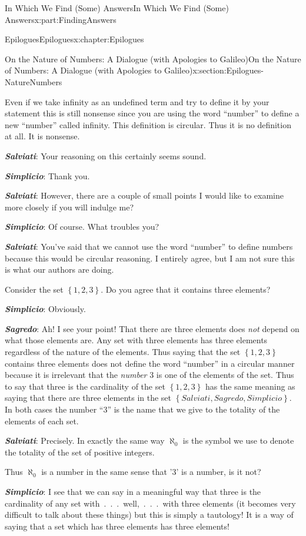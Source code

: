 \documentclass[oneside,10pt,]{book}
\newcommand{\alert}[1]{\textbf{\textit{#1}}}
\numberwithin{equation}{section}
\begin{document}
\begin{partptx}{In Which We Find (Some) Answers}{}{In Which We Find (Some) Answers}{}{}{x:part:FindingAnswers}
\begin{chapterptx}{Epilogues}{}{Epilogues}{}{}{x:chapter:Epilogues}
\begin{sectionptx}{On the Nature of Numbers: A Dialogue (with Apologies to Galileo)}{}{On the Nature of Numbers: A Dialogue (with Apologies to Galileo)}{}{}{x:section:Epilogues-NatureNumbers}
\begin{introduction}{}
\par
Even if we take infinity as an undefined term and try to define it by your statement this is still nonsense since you are using the word ``number'' to define a new ``number'' called infinity. This definition is circular. Thus it is no definition at all. It is nonsense.%
\par
\alert{Salviati}: Your reasoning on this certainly seems sound.%
\par
\alert{Simplicio}: Thank you.%
\par
\alert{Salviati}:  However, there are a couple of small points I would like to examine more closely if you will indulge me?%
\par
\alert{Simplicio}: Of course. What troubles you?%
\par
\alert{Salviati}: You've said that we cannot use the word ``number'' to define numbers because this would be circular reasoning. I entirely agree, but I am not sure this is what our authors are doing.%
\par
Consider the set \(\left\{1, 2, 3\right\}\). Do you agree that it contains three elements?%
\par
\alert{Simplicio}: Obviously.%
\par
\alert{Sagredo}: Ah! I see your point! That there are three elements does \emph{not} depend on what those elements are. Any set with three elements has three elements regardless of the nature of the elements. Thus saying that the set \(\left\{1, 2, 3\right\}\) contains three elements does not define the word ``number'' in a circular manner because it is irrelevant that the \emph{number} 3 is one of the elements of the set. Thus to say that three is the cardinality of the set \(\left\{1, 2, 3\right\}\) has the same meaning as saying that there are three elements in the set \(\left\{Salviati, Sagredo, Simplicio\right\}\). In both cases the number ``\(3\)'' is the name that we give to the totality of the elements of each set.%
\par
\alert{Salviati}:  Precisely. In exactly the same way \(\aleph_0\) is the symbol we use to denote the totality of the set of positive integers.%
\par
Thus \(\aleph_0\) is a number in the same sense that '\(3\)' is a number, is it not?%
\par
\alert{Simplicio}:  I see that we can say in a meaningful way that three is the cardinality of any set with~.~.~.~well,~.~.~.~with three elements (it becomes very difficult to talk about these things) but this is simply a tautology! It is a way of saying that a set which has three elements has three elements!%

\end{introduction}
\end{sectionptx}
\end{chapterptx}
\end{partptx}
\end{document}
